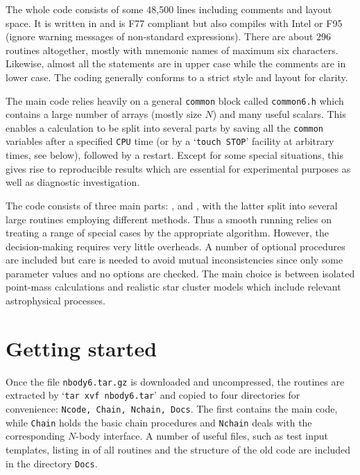 \documentclass[12pt]{article}
\begin{document}
The whole code consists of some 48,500 lines including comments and layout
space.
It is written in {} and is F77 compliant but also compiles
with Intel or F95 (ignore warning messages of non-standard expressions).
There are about 296 routines altogether, mostly with mnemonic names of
maximum six characters.
Likewise, almost all the {} statements are in upper case while
the comments are in lower case.
The coding generally conforms to a strict style and layout for clarity.

The main code relies heavily on a general {\tt common} block called
{\tt common6.h} which contains a large number of arrays (mostly size $N$) and
many useful scalars.
This enables a calculation to be split into several parts by saving all the
{\tt common} variables after a specified {\tt CPU} time (or by a
`{\tt touch STOP}' facility at arbitrary times, see below), followed by a
restart.
Except for some special situations, this gives rise to reproducible results
which are essential for experimental purposes as well as diagnostic
investigation.

The code consists of three main parts: {}, {} and
{}, with the latter split into several large routines
employing different methods.
Thus a smooth running relies on treating a range of special cases by the
appropriate algorithm.
However, the decision-making requires very little overheads.
A number of optional procedures are included but care is needed to avoid
mutual inconsistencies since only some parameter values and no options are
checked.
The main choice is between isolated point-mass calculations and
realistic star cluster models which include relevant astrophysical processes.

\section{Getting started}

Once the file {\tt nbody6.tar.gz} is downloaded and uncompressed, the routines
are extracted by `{\tt tar xvf nbody6.tar}' and copied to four directories
for convenience: {\tt Ncode, Chain, Nchain, Docs}.
The first contains the main code, while {\tt Chain} holds the basic chain
procedures and {\tt Nchain} deals with the corresponding $N$-body interface.
A number of useful files, such as test input templates, listing in {}
of all routines and the structure of the old code {} are included
in the directory {\tt Docs}.
\end{document}

